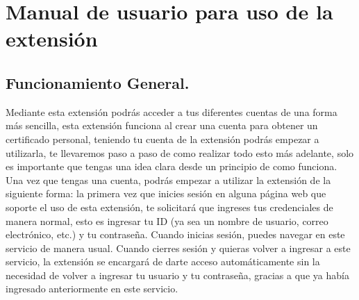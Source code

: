 \documentclass[12pt, a4paper, titlepage]{report}
\begin{document}
	\begin{appendix}
		\renewcommand*\contentsname{{\textcolor{azulescom}{Índice.}}}
		\tableofcontents
		\newpage
		\renewcommand*\listfigurename{{\textcolor{azulescom}{Índice de figuras.}}}
		\listoffigures
		\newpage
		
		
	\end{appendix}
	
	\renewcommand\thechapter{\arabic{chapter}}
    \renewcommand{\appendixname}{Capítulo}
    

    \chapter{\textcolor{azulescom}{Manual de usuario para uso de la extensión}}
     
    \section{Funcionamiento General.}
    Mediante esta extensión podrás acceder a tus diferentes cuentas de una forma más sencilla, esta extensión funciona al crear una cuenta para obtener un certificado personal, teniendo tu cuenta de la extensión podrás empezar a utilizarla, te llevaremos paso a paso de como realizar todo esto más adelante, solo es importante que tengas una idea clara desde un principio de como funciona.\\
    
    Una vez que tengas una cuenta, podrás empezar a utilizar la extensión de la siguiente forma: la primera vez que inicies sesión en alguna página web que soporte el uso de esta extensión, te solicitará que ingreses tus credenciales de manera normal, esto es ingresar tu ID (ya sea un nombre de usuario, correo electrónico, etc.) y tu contraseña. Cuando inicias sesión, puedes navegar en este servicio de manera usual. Cuando cierres sesión y quieras volver a ingresar a este servicio, la extensión se encargará de darte acceso automáticamente sin la necesidad de volver a ingresar tu usuario y tu contraseña, gracias a que ya había ingresado anteriormente en este servicio.\\
    
\end{document}
